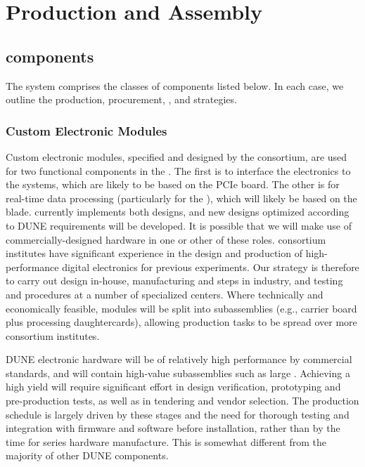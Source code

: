 
\section{Production and Assembly}
\label{sec:fd-daq-prod-assy}

\subsection{ components}

The   system comprises the classes of components listed below. In each case, we outline the production, procurement, , and  strategies.

\subsubsection{Custom Electronic Modules}

Custom electronic modules, specified and designed by the 
consortium, are used for two functional components in the 
. 
The first is to interface the  electronics to the   systems, which are likely to be based on the 
PCIe board.
The other is for real-time data processing (particularly for the
), which will likely be based on the
  blade.
 currently implements both designs, and new designs optimized according to
DUNE requirements will be developed.
It is possible that we will make use of commercially-designed hardware
in one or other of these roles.  consortium institutes have
significant experience in the design and production of high-performance digital electronics for previous experiments.
Our strategy is therefore to carry out design in-house, manufacturing
and  steps in industry, and testing and  procedures at a number of
specialized centers.
Where technically and economically feasible, modules will be split
into subassemblies (e.g., carrier board plus processing
daughtercards), allowing production tasks to be spread over more
consortium institutes.

DUNE electronic hardware will be of relatively high performance by commercial standards, and will contain high-value subassemblies such as large . Achieving a high yield will require significant effort in design verification, prototyping and pre-production tests, as well as in tendering and vendor selection. The production schedule is largely driven by these stages and the need for thorough testing and integration with firmware and software before installation, rather than by the time for series hardware manufacture. This is somewhat different from the majority of other DUNE  components.

